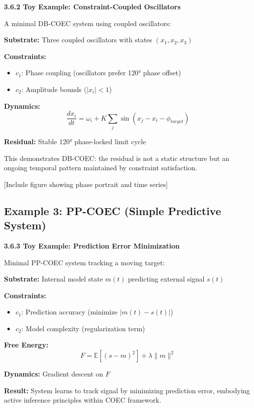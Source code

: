 \documentclass[11pt]{article}
\begin{document}
\begin{tcolorbox}[colback=add!10,colframe=add]
\textbf{3.6.2 Toy Example: Constraint-Coupled Oscillators}

A minimal DB-COEC system using coupled oscillators:

\textbf{Substrate:} Three coupled oscillators with states $(x_1, x_2, x_3)$

\textbf{Constraints:}
\begin{itemize}
    \item $c_1$: Phase coupling (oscillators prefer 120° phase offset)
    \item $c_2$: Amplitude bounds ($|x_i| < 1$)
\end{itemize}

\textbf{Dynamics:}
$$\frac{dx_i}{dt} = \omega_i + K\sum_j \sin(x_j - x_i - \phi_{target})$$

\textbf{Residual:} Stable 120° phase-locked limit cycle

This demonstrates DB-COEC: the residual is not a static structure but an ongoing temporal pattern maintained by constraint satisfaction.

[Include figure showing phase portrait and time series]
\end{tcolorbox}

\subsection{Example 3: PP-COEC (Simple Predictive System)}

\begin{tcolorbox}[colback=add!10,colframe=add]
\textbf{3.6.3 Toy Example: Prediction Error Minimization}

Minimal PP-COEC system tracking a moving target:

\textbf{Substrate:} Internal model state $m(t)$ predicting external signal $s(t)$

\textbf{Constraints:}
\begin{itemize}
    \item $c_1$: Prediction accuracy (minimize $|m(t) - s(t)|$)
    \item $c_2$: Model complexity (regularization term)
\end{itemize}

\textbf{Free Energy:}
$$F = \mathbb{E}[(s - m)^2] + \lambda \|m\|^2$$

\textbf{Dynamics:} Gradient descent on $F$

\textbf{Result:} System learns to track signal by minimizing prediction error, embodying active inference principles within COEC framework.
\end{tcolorbox}
\end{document}
